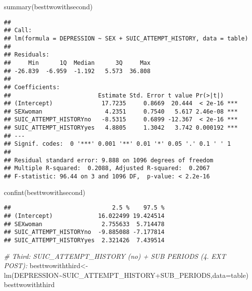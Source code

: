 \documentclass[
]{book}
\newenvironment{Shaded}{\begin{snugshade}}{\end{snugshade}}
\newcommand{\AttributeTok}[1]{\textcolor[rgb]{0.77,0.63,0.00}{#1}}
\newcommand{\CommentTok}[1]{\textcolor[rgb]{0.56,0.35,0.01}{\textit{#1}}}
\newcommand{\FunctionTok}[1]{\textcolor[rgb]{0.00,0.00,0.00}{#1}}
\newcommand{\NormalTok}[1]{#1}
\newcommand{\OtherTok}[1]{\textcolor[rgb]{0.56,0.35,0.01}{#1}}
\newcommand{\SpecialCharTok}[1]{\textcolor[rgb]{0.00,0.00,0.00}{#1}}
\begin{document}
\begin{Shaded}
\begin{Highlighting}[]
\FunctionTok{summary}\NormalTok{(besttwowithsecond)}
\end{Highlighting}
\end{Shaded}

\begin{verbatim}
## 
## Call:
## lm(formula = DEPRESSION ~ SEX + SUIC_ATTEMPT_HISTORY, data = table)
## 
## Residuals:
##     Min      1Q  Median      3Q     Max 
## -26.839  -6.959  -1.192   5.573  36.808 
## 
## Coefficients:
##                         Estimate Std. Error t value Pr(>|t|)    
## (Intercept)              17.7235     0.8669  20.444  < 2e-16 ***
## SEXwoman                  4.2351     0.7540   5.617 2.46e-08 ***
## SUIC_ATTEMPT_HISTORYno   -8.5315     0.6899 -12.367  < 2e-16 ***
## SUIC_ATTEMPT_HISTORYyes   4.8805     1.3042   3.742 0.000192 ***
## ---
## Signif. codes:  0 '***' 0.001 '**' 0.01 '*' 0.05 '.' 0.1 ' ' 1
## 
## Residual standard error: 9.888 on 1096 degrees of freedom
## Multiple R-squared:  0.2088, Adjusted R-squared:  0.2067 
## F-statistic: 96.44 on 3 and 1096 DF,  p-value: < 2.2e-16
\end{verbatim}

\begin{Shaded}
\begin{Highlighting}[]
\FunctionTok{confint}\NormalTok{(besttwowithsecond)}
\end{Highlighting}
\end{Shaded}

\begin{verbatim}
##                             2.5 %    97.5 %
## (Intercept)             16.022499 19.424514
## SEXwoman                 2.755633  5.714478
## SUIC_ATTEMPT_HISTORYno  -9.885088 -7.177814
## SUIC_ATTEMPT_HISTORYyes  2.321426  7.439514
\end{verbatim}

\begin{Shaded}
\begin{Highlighting}[]
\CommentTok{\# Third: SUIC\_ATTEMPT\_HISTORY (no) + SUB PERIODS (4. EXT POST):}
\NormalTok{besttwowiththird}\OtherTok{\textless{}{-}}\FunctionTok{lm}\NormalTok{(DEPRESSION}\SpecialCharTok{\textasciitilde{}}\NormalTok{SUIC\_ATTEMPT\_HISTORY}\SpecialCharTok{+}\NormalTok{SUB\_PERIODS,}\AttributeTok{data=}\NormalTok{table)}
\NormalTok{besttwowiththird}
\end{Highlighting}
\end{Shaded}
\end{document}
